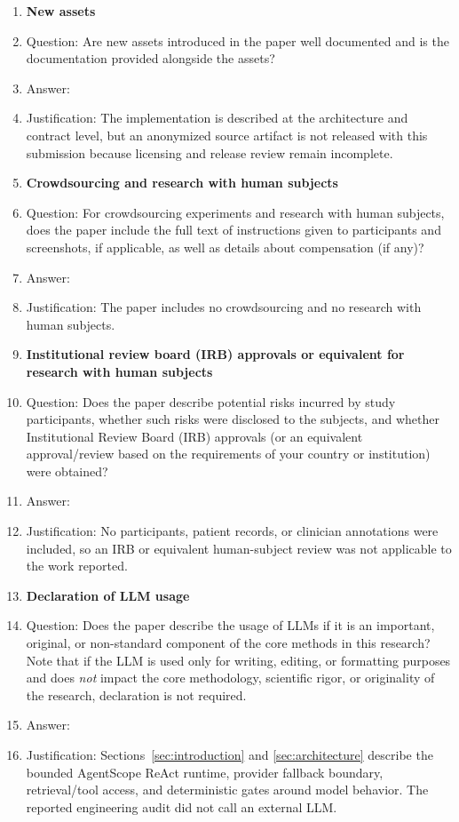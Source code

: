 \begin{enumerate}
\item {\bf New assets}
    \item[] Question: Are new assets introduced in the paper well documented and is the documentation provided alongside the assets?
    \item[] Answer: \answerNo{}
    \item[] Justification: The implementation is described at the architecture
    and contract level, but an anonymized source artifact is not released with
    this submission because licensing and release review remain incomplete.

\item {\bf Crowdsourcing and research with human subjects}
    \item[] Question: For crowdsourcing experiments and research with human subjects, does the paper include the full text of instructions given to participants and screenshots, if applicable, as well as details about compensation (if any)?
    \item[] Answer: \answerNA{}
    \item[] Justification: The paper includes no crowdsourcing and no research
    with human subjects.

\item {\bf Institutional review board (IRB) approvals or equivalent for research with human subjects}
    \item[] Question: Does the paper describe potential risks incurred by study participants, whether such risks were disclosed to the subjects, and whether Institutional Review Board (IRB) approvals (or an equivalent approval/review based on the requirements of your country or institution) were obtained?
    \item[] Answer: \answerNA{}
    \item[] Justification: No participants, patient records, or clinician
    annotations were included, so an IRB or equivalent human-subject review
    was not applicable to the work reported.

\item {\bf Declaration of LLM usage}
    \item[] Question: Does the paper describe the usage of LLMs if it is an important, original, or non-standard component of the core methods in this research? Note that if the LLM is used only for writing, editing, or formatting purposes and does \emph{not} impact the core methodology, scientific rigor, or originality of the research, declaration is not required.
    \item[] Answer: \answerYes{}
    \item[] Justification: Sections~\ref{sec:introduction} and
    \ref{sec:architecture} describe the bounded AgentScope ReAct runtime,
    provider fallback boundary, retrieval/tool access, and deterministic
    gates around model behavior.  The reported engineering audit did not call
    an external LLM.

\end{enumerate}
